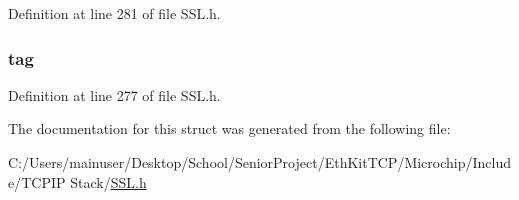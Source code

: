 Definition at line 281 of file S\+S\+L.\+h.

\hypertarget{struct_s_s_l___s_e_s_s_i_o_n___s_t_u_b_ab0e262b86259275e6c2dc760e6c5b41c}{}
\subsubsection[{tag}]{ tag}\label{struct_s_s_l___s_e_s_s_i_o_n___s_t_u_b_ab0e262b86259275e6c2dc760e6c5b41c}


Definition at line 277 of file S\+S\+L.\+h.



The documentation for this struct was generated from the following file\+:\begin{DoxyCompactItemize}
\item 
C\+:/\+Users/mainuser/\+Desktop/\+School/\+Senior\+Project/\+Eth\+Kit\+T\+C\+P/\+Microchip/\+Include/\+T\+C\+P\+I\+P Stack/\hyperlink{_s_s_l_8h}{S\+S\+L.\+h}\end{DoxyCompactItemize}
